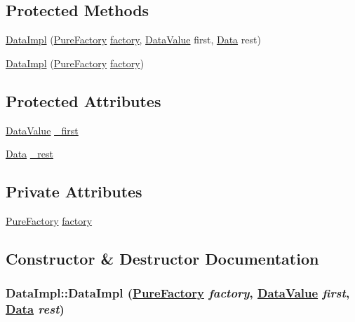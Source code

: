 \subsection*{Protected Methods}
\begin{CompactItemize}
\item 
\hyperlink{classDataImpl_b0}{Data\-Impl} (\hyperlink{classPureFactory}{Pure\-Factory} \hyperlink{classDataImpl_o0}{factory}, \hyperlink{interfaceDataValue}{Data\-Value} first, \hyperlink{interfaceData}{Data} rest)
\item 
\hyperlink{classDataImpl_b1}{Data\-Impl} (\hyperlink{classPureFactory}{Pure\-Factory} \hyperlink{classDataImpl_o0}{factory})
\end{CompactItemize}
\subsection*{Protected Attributes}
\begin{CompactItemize}
\item 
\hyperlink{interfaceDataValue}{Data\-Value} \hyperlink{classDataImpl_n0}{\_\-first}
\item 
\hyperlink{interfaceData}{Data} \hyperlink{classDataImpl_n1}{\_\-rest}
\end{CompactItemize}
\subsection*{Private Attributes}
\begin{CompactItemize}
\item 
\hyperlink{classPureFactory}{Pure\-Factory} \hyperlink{classDataImpl_o0}{factory}
\end{CompactItemize}


\subsection{Constructor \& Destructor Documentation}
\hypertarget{classDataImpl_b0}{
\subsubsection[DataImpl]{\setlength{\rightskip}{0pt plus 5cm}Data\-Impl::Data\-Impl (\hyperlink{classPureFactory}{Pure\-Factory} {\em factory}, \hyperlink{interfaceDataValue}{Data\-Value} {\em first}, \hyperlink{interfaceData}{Data} {\em rest})}}
\label{classDataImpl_b0}




